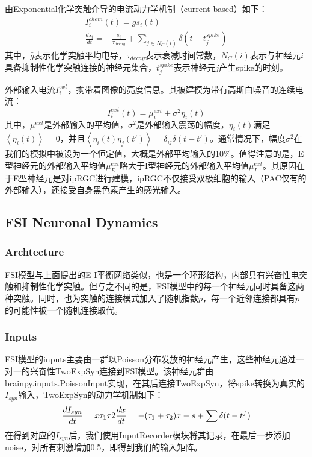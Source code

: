 \documentclass[lang=cn,11pt,a4paper,cite=numbers]{elegantpaper}
\begin{document}
  由Exponential化学突触介导的电流动力学机制（current-based）如下：
\begin{gather}
    I_{i}^{chem}(t) = \bar{g}s_{i}(t) \\
    \frac{ds_{i}}{dt} = -\frac{s_{i}}{\tau_{decay}} + \sum_{j \in N_{C}(i)}\delta(t - t_{j}^{spike})
\end{gather}
其中，$\bar{g}$表示化学突触平均电导，$\tau_{decay}$表示衰减时间常数，$N_{C}(i)$表示与神经元$i$具备抑制性化学突触连接的神经元集合，$t_{j}^{spike}$表示神经元$j$产生spike的时刻。

  外部输入电流$I_{i}^{ext}$，携带着图像的亮度信息。其被建模为带有高斯白噪音的连续电流：
\begin{equation}
    I_{i}^{ext}(t) = \mu_{i}^{ext} + \sigma^{2}\eta_{i}(t)
\end{equation}
其中，$\mu^{ext}$是外部输入的平均值，$\sigma^{2}$是外部输入震荡的幅度，$\eta_{i}(t)$满足$\left\langle\eta_{i}(t)\right\rangle = 0$，并且$\left\langle\eta_{i}(t)\eta_{j}(t')\right\rangle = \delta_{ij}\delta(t - t')$。通常情况下，幅度$\sigma^{2}$在我们的模拟中被设为一个恒定值，大概是外部平均输入的10\%。值得注意的是，E型神经元的外部输入平均值$\mu_{E}^{ext}$略大于I型神经元的外部输入平均值$\mu_{I}^{ext}$。其原因在于E型神经元是对ipRGC进行建模，ipRGC不仅接受双极细胞的输入（PAC仅有的外部输入），还接受自身黑色素产生的感光输入。

\subsection{FSI Neuronal Dynamics}
\subsubsection{Archtecture}
  FSI模型与上面提出的E-I平衡网络类似，也是一个环形结构，内部具有兴奋性电突触和抑制性化学突触。但与之不同的是，FSI模型中的每一个神经元同时具备这两种突触。同时，也为突触的连接模式加入了随机指数$p$，每一个近邻连接都具有$p$的可能性被一个随机连接取代。
\subsubsection{Inputs}
  FSI模型的inputs主要由一群以Poisson分布发放的神经元产生，这些神经元通过一对一的兴奋性TwoExpSyn连接到FSI模型。该神经元群由brainpy.inputs.PoissonInput实现，在其后连接TwoExpSyn，将spike转换为真实的$I_{syn}$输入，TwoExpSyn的动力学机制如下：
\begin{equation}
  \frac{dI_{syn}}{dt}=x \\
  \tau_{1}\tau{2}\frac{dx}{dt}=-(\tau_{1}+\tau_{2})x-s+\sum\delta(t-t^{f})
\end{equation}
在得到对应的$I_{syn}$后，我们使用InputRecorder模块将其记录，在最后一步添加noise，对所有刺激增加0.5，即得到我们的输入矩阵。
\end{document}
